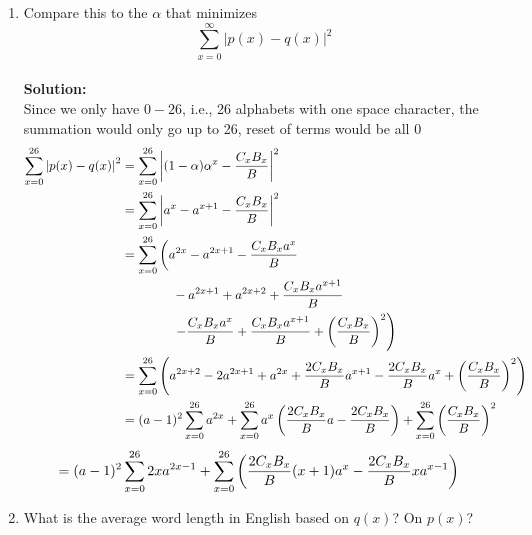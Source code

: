 \documentclass{assignment}
\begin{document}
\begin{enumerate}
\begin{enumerate}
  \item Compare this to the $\alpha$ that minimizes
    $$ \sum_{x=0}^\infty \left| p(x) -  q(x) \right|^2 $$ \\
    \textbf{Solution:} \\
    Since we only have $0-26$, i.e., 26 alphabets with one space character, the summation would only go up to 26, reset
    of terms would be all 0
    \begin{align*}
      \sum_{x=0}^{26} \left| p(x) -  q(x) \right|^2
      & = \sum_{x=0}^{26} \left| (1- \alpha) \alpha^x - \dfrac{C_xB_x}{B}\right|^2 \\
      & = \sum_{x=0}^{26} \left| a^x - a^{x+1} - \dfrac{C_xB_x}{B}\right|^2 \\
      & = \sum_{x=0}^{26} \left(  a^{2x} - a^{2x+1} - \dfrac{C_xB_xa^x}{B} \right. \\
      & \quad \quad \quad \quad - a^{2x+1} + a^{2x+2} + \dfrac{C_xB_xa^{x+1}}{B} \\
      & \quad \quad \quad \quad \left. - \dfrac{C_xB_xa^{x}}{B} + \dfrac{C_xB_xa^{x+1}}{B} + \left(\dfrac{C_xB_x}{B}\right)^2
        \right) \\
      & = \sum_{x=0}^{26} \left(a^{2x+2} - 2a^{2x+1} + a^{2x} + \dfrac{2C_xB_x}{B}a^{x+1} - \dfrac{2C_xB_x}{B}a^{x} +
        \left(\dfrac{C_xB_x}{B} \right)^2 \right) \\
      & = (a - 1)^2\sum_{x=0}^{26} a^{2x}  + \sum_{x=0}^{26} a^{x} \left(\dfrac{2C_xB_x}{B} a - \dfrac{2C_xB_x}{B}\right)
        + \sum_{x=0}^{26}\left(\dfrac{C_xB_x}{B}\right)^2
    \end{align*}
    \begin{align*}
      & = (a - 1)^2\sum_{x=0}^{26} 2xa^{2x-1} + \sum_{x=0}^{26} \left(\dfrac{2C_xB_x}{B}(x+1)a^{x} - \dfrac{2C_xB_x}{B}xa^{x-1}\right)
    \end{align*}

  \item What is the average word length in English based on $q(x)$? On $p(x)$?
  \end{enumerate}
\end{enumerate}
\end{document}
